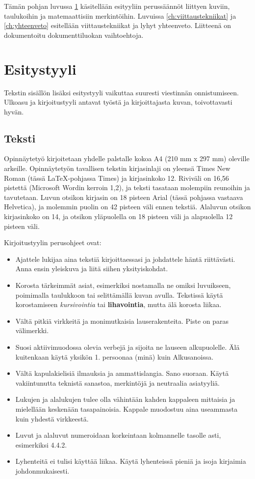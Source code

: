 \documentclass[globalnumbering,centeredcaptions,draftfooter]{tutthesis/tutthesis} %
\begin{document}
Tämän pohjan luvussa \ref{ch:esitystyyli} käsitellään esityyliin perussäännöt liittyen kuviin, taulukoihin ja matemaattisiin merkintöihin.
Luvuissa \ref{ch:viittaustekniikat} ja \ref{ch:yhteenveto} esitellään viittaustekniikat ja lyhyt yhteenveto.
Liitteenä on dokumentoitu dokumenttiluokan vaihtoehtoja.



\chapter{Esitystyyli}
\label{ch:esitystyyli}

Tekstin sisällön lisäksi esitystyyli vaikuttaa suuresti viestinnän onnistumiseen.
Ulkoasu ja kirjoitustyyli antavat työstä ja kirjoittajasta kuvan, toivottavasti hyvän.

\section{Teksti}

Opinnäytetyö kirjoitetaan yhdelle palstalle kokoa A4 (210 mm x 297 mm) oleville arkeille.
Opinnäytetyön tavallisen tekstin kirjasinlaji on yleensä Times New Roman (tässä LaTeX-pohjassa Times) ja kirjasinkoko 12.
Riviväli on 16,56 pistettä (Microsoft Wordin kerroin 1,2), ja teksti tasataan molempiin reunoihin ja tavutetaan.
Luvun otsikon kirjasin on 18 pisteen Arial (tässä pohjassa vastaava Helvetica), ja molemmin puolin on 42 pisteen väli ennen tekstiä.
Alaluvun otsikon kirjasinkoko on 14, ja otsikon yläpuolella on 18 pisteen väli ja alapuolella 12 pisteen väli.


Kirjoitustyylin perusohjeet ovat:
\begin{itemize} %
  \item Ajattele lukijaa aina tekstiä kirjoittaessasi ja johdattele häntä riittävästi. Anna ensin yleiskuva ja liitä siihen yksityiskohdat. 
  \item Korosta tärkeimmät asiat, esimerkiksi nostamalla ne omiksi luvuikseen, poimimalla taulukkoon tai selittämällä kuvan avulla. Tekstissä käytä korostamiseen \emph{kursivointia} tai \textbf{lihavointia}, mutta älä korosta liikaa.
  \item Vältä pitkiä virkkeitä ja monimutkaisia lauserakenteita. Piste on paras välimerkki. 
  \item Suosi aktiivimuodossa olevia verbejä ja sijoita ne lauseen alkupuolelle. Älä kuitenkaan käytä yksikön 1. persoonaa (minä) kuin Alkusanoissa. 
  \item Vältä kapulakielisiä ilmauksia ja ammattislangia. Sano suoraan. Käytä vakiintunutta teknistä sanastoa, merkintöjä ja neutraalia asiatyyliä. 
  \item Lukujen ja alalukujen tulee olla vähintään kahden kappaleen mittaisia ja mielellään keskenään tasapainoisia. Kappale muodostuu aina useammasta kuin yhdestä virkkeestä. 
  \item Luvut ja alaluvut numeroidaan korkeintaan kolmannelle tasolle asti, esimerkiksi 4.4.2.
  \item Lyhenteitä ei tulisi käyttää liikaa. Käytä lyhenteissä pieniä ja isoja kirjaimia johdonmukaisesti. 
\end{itemize}
\end{document}
